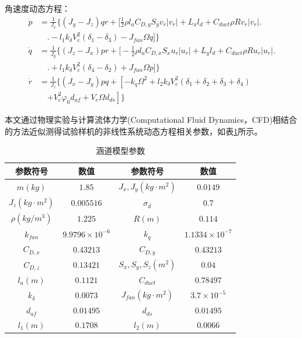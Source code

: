 角速度动态方程：
\begin{equation}
    \begin{aligned}
        \dot{p}  &=\frac{1}{J_x}\Bigg\{ (J_y-J_z)qr+
        \bigg[\frac{1}{2}\rho{l_a} C_{D,y}S_yv_r|v_r|+L_xl_d+C_{duct}\rho{R}
        v_r|v_r| \bigg.\\
        & \quad\bigg.- l_1k_\delta V_e^2(\delta_1 - \delta_3)-J_{fan}\Omega{q}\bigg]\Bigg\} \\
        \dot{q}  &=\frac{1}{J_y}\Bigg\{ (J_z-J_x)pr+
        \bigg[-\frac{1}{2}\rho{l_a} C_{D,x}S_xu_r|u_r|+L_yl_d+C_{duct}\rho{R}
        u_r|u_r| \bigg.\\
        & \quad\bigg.+ l_1k_\delta V_e^2(\delta_4 - \delta_2)+J_{fan}\Omega{p}\bigg]\Bigg\} \\
        \dot{r}  &=\frac{1}{J_z}\Bigg\{ (J_x-J_y)pq+
        \left[-k_q\Omega^2 +l_2k_\delta V_e^2(\delta_1 + \delta_2 + \delta_3 + \delta_4)\right.\\
        & \quad\left.+V_e^2\varphi_0d_{af}+V_e\Omega{d_{ds}}\right]
        \Bigg\}
    \end{aligned}
    \label{eq_43}
\end{equation}

本文通过物理实验与计算流体力学(Computational Fluid Dynamics，CFD)相结合的方法近似测得试验样机的非线性系统动态方程相关参数，如表\ref{DFUAV_parameters}所示。

\begin{table}
	\caption{\label{DFUAV_parameters}涵道模型参数}
	\centering
	\small 
	\begin{tabular}{cccc}
		\hline 
		参数符号 & 数值                & 参数符号 & 数值                 \tabularnewline
		\hline 
		$m(kg)$   & $1.85$ 		     & $J_x,J_y(kg\cdot{m}^2)$   & $0.0149         $ \tabularnewline
		$J_z(kg\cdot{m}^2)$   & $0.005516$ & $\sigma_d$   & $0.7$ \tabularnewline
        $\rho(kg/m^3)$   & $1.225$ & $R(m)$   & $0.114$ \tabularnewline
        $k_{fan}$   & $9.9796\times10^{-6}$ & $k_q$   & $1.1334\times10^{-7}$ \tabularnewline
        $C_{D,x}$   & $0.43213$ & $C_{D,y}$   & $0.43213$ \tabularnewline
        $C_{D,z}$   & $0.13421$ & $S_x,S_y,S_z(m^2)$   & $0.04$ \tabularnewline
        $l_a(m)$   & $0.1121$ & $C_{duct}$   & $0.78497$ \tabularnewline
        $k_{\delta}$   & $0.0073$ & $J_{fan}(kg\cdot{m}^2)$   & $3.7\times10^{-5}$ \tabularnewline
        $d_{af}$   & $0.01495$ & $d_{ds}$   & $0.01495$ \tabularnewline
        $l_1(m)$   & $0.1708$ & $l_2(m)$   & $0.0066$ \tabularnewline
		\hline 
	\end{tabular}
\end{table}

